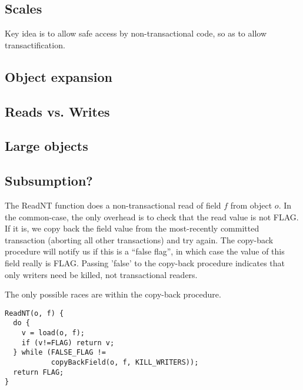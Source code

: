 \documentclass[preprint]{rdbacmconf}
\begin{document}
\subsection{Scales}
Key idea is to allow safe access by non-transactional code, so as to
allow transactification.

\subsection{Object expansion}
\subsection{Reads vs. Writes}
\subsection{Large objects}
\subsection{Subsumption?}



The ReadNT function does a non-transactional read of field $f$ from
object $o$.  In the common-case, the only overhead is to check that
the read value is not FLAG.  If it is, we copy back the field value
from the most-recently committed transaction (aborting all other
transactions) and try again.  The copy-back procedure will notify
us if this is a ``false flag'', in which case the value of this
field really is FLAG.  Passing 'false' to the copy-back procedure
indicates that only writers need be killed, not transactional readers.

The only possible races are within the copy-back procedure.
\par {\footnotesize\samepage
\begin{verbatim}
ReadNT(o, f) {
  do {
    v = load(o, f);
    if (v!=FLAG) return v;
  } while (FALSE_FLAG !=
           copyBackField(o, f, KILL_WRITERS));
  return FLAG;
}
\end{verbatim}
}
\end{document}
